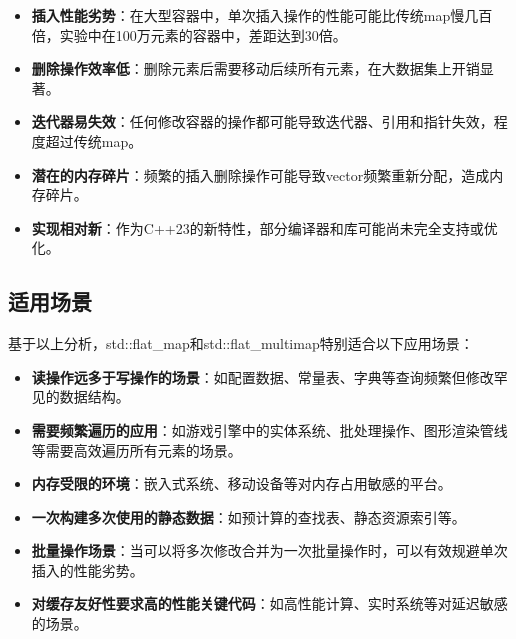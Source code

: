 \documentclass[a4paper, 12pt]{article}
\begin{document}
\begin{itemize}
    \setlength{\itemsep}{0pt}
    \setlength{\parsep}{0pt}
    \setlength{\parskip}{0pt}
    \item \textbf{插入性能劣势}：在大型容器中，单次插入操作的性能可能比传统map慢几百倍，实验中在100万元素的容器中，差距达到30倍。
    
    \item \textbf{删除操作效率低}：删除元素后需要移动后续所有元素，在大数据集上开销显著。
    
    \item \textbf{迭代器易失效}：任何修改容器的操作都可能导致迭代器、引用和指针失效，程度超过传统map。
    
    \item \textbf{潜在的内存碎片}：频繁的插入删除操作可能导致vector频繁重新分配，造成内存碎片。
    
    \item \textbf{实现相对新}：作为C++23的新特性，部分编译器和库可能尚未完全支持或优化。
\end{itemize}

\subsection{适用场景}

基于以上分析，std::flat\_map和std::flat\_multimap特别适合以下应用场景：

\begin{itemize}
    \setlength{\itemsep}{0pt}
    \setlength{\parsep}{0pt}
    \setlength{\parskip}{0pt}
    \item \textbf{读操作远多于写操作的场景}：如配置数据、常量表、字典等查询频繁但修改罕见的数据结构。
    
    \item \textbf{需要频繁遍历的应用}：如游戏引擎中的实体系统、批处理操作、图形渲染管线等需要高效遍历所有元素的场景。
    
    \item \textbf{内存受限的环境}：嵌入式系统、移动设备等对内存占用敏感的平台。
    
    \item \textbf{一次构建多次使用的静态数据}：如预计算的查找表、静态资源索引等。
    
    \item \textbf{批量操作场景}：当可以将多次修改合并为一次批量操作时，可以有效规避单次插入的性能劣势。
    
    \item \textbf{对缓存友好性要求高的性能关键代码}：如高性能计算、实时系统等对延迟敏感的场景。
\end{itemize}
\end{document}
